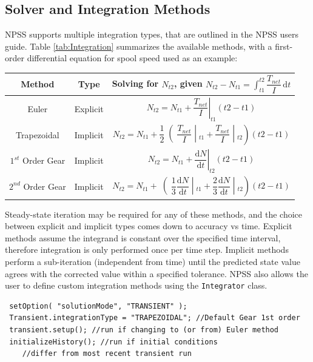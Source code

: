 \documentclass[heading.tex]{subfiles}
\begin{document}
\subsection{Solver and Integration Methods}
NPSS supports multiple integration types, that are outlined in the NPSS users guide. \cite[chap.~7.1]{NPSS} Table \ref{tab:Integration} summarizes the available methods, with a first-order differential equation for spool speed used as an example: 

\begin{minipage}{\linewidth}
\centering
\bigskip
{} \label{tab:Integration}
\begin{tabular}{|c|c|c|}
\hline 
Method & Type & Solving for  $N_{t2}$, given  $N_{t2}- N_{t1}= \int_{t1}^{t2} \! \dfrac{T_{net}}{I} \, \mathrm{d}t $\\ 
\hline 
Euler & Explicit & $ \left.N_{t2}= N_{t1} + \dfrac{T_{net}}{I} \right|_{t1}^{}(t2-t1)$ \\ 
\hline 
Trapezoidal & Implicit & $ \left.N_{t2}= N_{t1} + \dfrac{1}{2}\middle(\dfrac{T_{net}}{I} \middle|_{t1}^{}+\dfrac{T_{net}}{I} \middle|_{t2}^{}\right)(t2-t1)$ \\ 
\hline 
$1^{st}$ Order Gear & Implicit & $ \left.N_{t2}= N_{t1} + \dfrac{ \mathrm{d}N }{ \mathrm{d}t } \right|_{t2}^{}(t2-t1)$ \\ 
\hline 
$2^{nd}$ Order Gear & Implicit & $ \left.N_{t2}= N_{t1} + \middle(\dfrac{1}{3}\dfrac{ \mathrm{d}N }{ \mathrm{d}t }\middle|_{t1}^{}+\dfrac{2}{3}\dfrac{ \mathrm{d}N }{ \mathrm{d}t }\middle|_{t2}^{}\right)(t2-t1)$ \\ 
\hline 
\end{tabular} 
\end{minipage}

Steady-state iteration may be required for any of these methods, and the choice between explicit and implicit types comes down to accuracy vs time. Explicit methods assume the integrand is constant over the specified time interval, therefore integration is only performed once per time step. Implicit methods perform a sub-iteration (independent from time) until the predicted state value agrees with the corrected value within a specified tolerance. NPSS also allows the user to define custom integration methods using the \texttt{Integrator} class. \cite[chap.~15.2]{NPSS}  

\begin{adjustwidth}{-0.5cm}{-0.5cm}
 \begin{verbatim}
 setOption( "solutionMode", "TRANSIENT" );
 Transient.integrationType = "TRAPEZOIDAL"; //Default Gear 1st order
 transient.setup(); //run if changing to (or from) Euler method
 initializeHistory(); //run if initial conditions 
 	//differ from most recent transient run
 \end{verbatim}
 \end{adjustwidth} 
       
\end{document}
